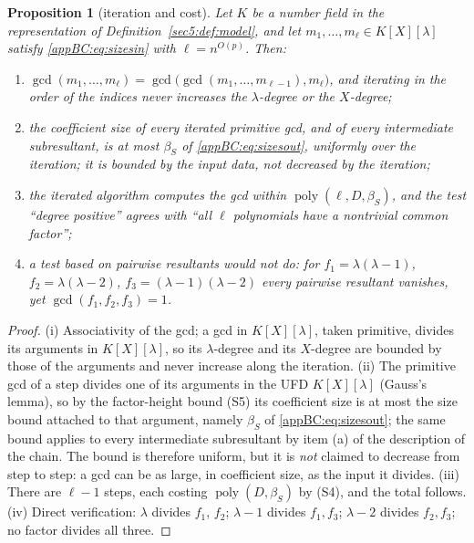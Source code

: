 \documentclass[journal]{IEEEtran}
\theoremstyle{plainn}
\newtheorem{prop}[thm]{Proposition}
\theoremstyle{remark}
\newcommand{\poly}{\operatorname{poly}}
\begin{document}
\begin{prop}[iteration and cost]\label{appBC:prop:iter}\label{appBC:prop:cost}\label{appBC:rem:pairwise}
Let $K$ be a number field in the representation of Definition~\ref{sec5:def:model}, and let
$m_1,\dots,m_\ell\in K[X][\lambda]$ satisfy \eqref{appBC:eq:sizesin} with $\ell=n^{O(p)}$. Then:
\begin{enumerate}[label=(\roman*),leftmargin=*]
\item $\gcd(m_1,\dots,m_\ell)=\gcd\bigl(\gcd(m_1,\dots,m_{\ell-1}),m_\ell\bigr)$, and iterating in the
order of the indices never increases the $\lambda$-degree or the $X$-degree;
\item the coefficient size of every iterated primitive gcd, and of every intermediate subresultant, is
at most $\beta_S$ of \eqref{appBC:eq:sizesout}, \emph{uniformly} over the iteration; it is bounded by
the input data, not decreased by the iteration;
\item the iterated algorithm computes the gcd within $\poly(\ell,D,\beta_S)$, and the test ``degree
positive'' agrees with ``all $\ell$ polynomials have a nontrivial common factor'';
\item a test based on \emph{pairwise} resultants would not do: for $f_1=\lambda(\lambda-1)$,
$f_2=\lambda(\lambda-2)$, $f_3=(\lambda-1)(\lambda-2)$ every pairwise resultant vanishes, yet
$\gcd(f_1,f_2,f_3)=1$.
\end{enumerate}
\end{prop}

\begin{proof}
(i) Associativity of the gcd; a gcd in $K[X][\lambda]$, taken primitive, divides its arguments in
$K[X][\lambda]$, so its $\lambda$-degree and its $X$-degree are bounded by those of the arguments and
never increase along the iteration. (ii) The primitive gcd of a step divides one of its arguments in
the UFD $K[X][\lambda]$ (Gauss's lemma), so by the factor-height bound (S5) its coefficient size is at
most the size bound attached to that argument, namely $\beta_S$ of \eqref{appBC:eq:sizesout}; the same
bound applies to every intermediate subresultant by item (a) of the description of the chain. The bound
is therefore uniform, but it is \emph{not} claimed to decrease from step to step: a gcd can be as
large, in coefficient size, as the input it divides. (iii) There are $\ell-1$ steps, each costing
$\poly(D,\beta_S)$ by (S4), and the total follows. (iv) Direct verification: $\lambda$ divides $f_1$,
$f_2$; $\lambda-1$ divides $f_1,f_3$; $\lambda-2$ divides $f_2,f_3$; no factor divides all three.
\end{proof}
\end{document}
